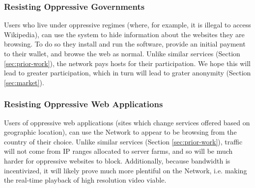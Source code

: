 \subsubsection{Resisting Oppressive Governments}

Users who live under oppressive regimes (where, for example, it is illegal to access Wikipedia), can use the system to hide information about the websites they are browsing. To do so they install and run the \Orchid{} software, provide an initial payment to their \Orchid{} wallet, and browse the web as normal. Unlike similar services (Section \ref{sec:prior-work}), the network pays hosts for their participation. We hope this will lead to greater participation, which in turn will lead to grater anonymity (Section \ref{sec:market}).

\subsubsection{Resisting Oppressive Web Applications}

Users of oppressive web applications (sites which change services offered based on geographic location), can use the \Orchid{} Network to appear to be browsing from the country of their choice. Unlike similar services (Section \ref{sec:prior-work}), traffic will not come from IP ranges allocated to server farms, and so will be much harder for oppressive websites to block. Additionally, because bandwidth is incentivized, it will likely prove much more plentiful on the \Orchid{} Network, i.e. making the real-time playback of high resolution video viable.
